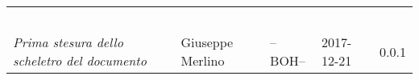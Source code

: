 \newpage 
\section*{}
\begin{table}[H]
	\centering
	\begin{tabular}{p{4cm}|C{3cm}|C{3cm}|R{2.5cm}|R{2cm}}
		
		 & & & & \\
		
		&&&&\\
		\hline
		&&&&\\
		\hline
		&&&&\\
		\hline
		&&&&\\
		\hline
		
		\emph{Prima stesura dello scheletro del documento} & Giuseppe Merlino & --BOH-- & 2017-12-21 & 0.0.1 \\
		
	\end{tabular}
	
\end{table}


\clearpage